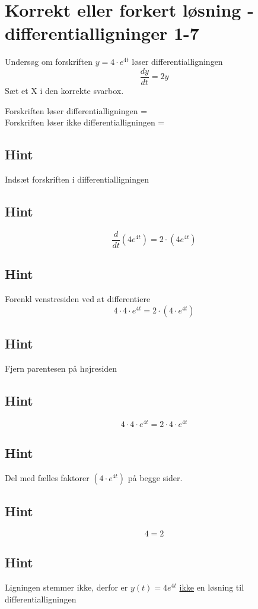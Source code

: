 \documentclass{article}
\newenvironment{exercise}[1]{\newpage\section{#1}}{}
\newcommand{\answerbox}[1]{\fbox{$#1$}}
\newcommand{\hint}{\subsection*{Hint}}
\begin{document}
\begin{exercise}{Korrekt eller forkert løsning - differentialligninger 1-7}
	
	
	Undersøg om forskriften $y = 4 \cdot e^{4t}$ løser differentialligningen
	\[
	\frac{dy}{dt} = 2y
	\]
	Sæt et X i den korrekte svarbox.
	
	Forskriften løser differentialligningen = \answerbox{} \\
	
	Forskriften løser ikke differentialligningen = \answerbox{X}
	
	\hint
	
	Indsæt forskriften i differentialligningen
	
	\hint
	\[
	\frac{d}{dt} \left( 4 e^{4t}\right) = 2 \cdot \left( 4 e^{4t} \right)
	\]
	
	
	\hint
	
	Forenkl venstresiden ved at differentiere
	\[
	4 \cdot 4 \cdot e^{4t} = 2 \cdot \left(4 \cdot e^{4t} \right)
	\]
	
	\hint
	
	Fjern parentesen på højresiden
	
	\hint
	\[
	4 \cdot 4 \cdot e^{4t} = 2 \cdot 4 \cdot e^{4t}
	\]
	
	\hint
	Del med fælles faktorer $\left( 4 \cdot e^{4t} \right)$ på begge sider.
	
	\hint
	
	\[
	4 = 2
	\]
	
	
	\hint
	
	Ligningen stemmer ikke, derfor er $y(t) = 4 e^{4t}$ \underline{ikke} en løsning til differentialligningen
	
\end{exercise}

\newpage
\end{document}
